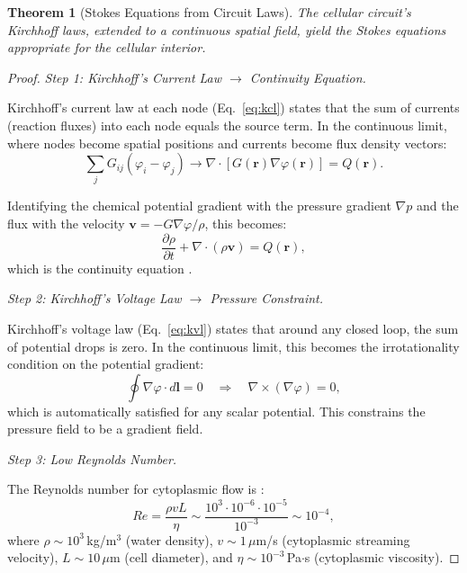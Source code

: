 \documentclass[11pt,twocolumn,a4paper]{article}
\newtheorem{theorem}{Theorem}[section]
\begin{document}
\begin{theorem}[Stokes Equations from Circuit Laws]
\label{thm:stokes-from-kirchhoff}
The cellular circuit's Kirchhoff laws, extended to a continuous spatial
field, yield the Stokes equations appropriate for the cellular interior.
\end{theorem}

\begin{proof}
\textit{Step 1: Kirchhoff's Current Law $\to$ Continuity Equation.}

Kirchhoff's current law at each node (Eq.~\eqref{eq:kcl}) states that
the sum of currents (reaction fluxes) into each node equals the source
term. In the continuous limit, where nodes become spatial positions and
currents become flux density vectors:
\begin{equation}
\sum_j G_{ij}(\varphi_i - \varphi_j) \to
  \nabla \cdot [G(\mathbf{r}) \nabla\varphi(\mathbf{r})]
  = Q(\mathbf{r}).
\label{eq:continuous-kcl}
\end{equation}

Identifying the chemical potential gradient with the pressure gradient
$\nabla p$ and the flux with the velocity $\mathbf{v} = -G \nabla
\varphi / \rho$, this becomes:
\begin{equation}
\frac{\partial \rho}{\partial t} +
  \nabla \cdot (\rho \mathbf{v}) = Q(\mathbf{r}),
\label{eq:continuity}
\end{equation}
which is the continuity equation \citep{navierstokes}.

\textit{Step 2: Kirchhoff's Voltage Law $\to$ Pressure Constraint.}

Kirchhoff's voltage law (Eq.~\eqref{eq:kvl}) states that around any
closed loop, the sum of potential drops is zero. In the continuous
limit, this becomes the irrotationality condition on the potential
gradient:
\begin{equation}
\oint \nabla\varphi \cdot d\mathbf{l} = 0
  \quad \Longrightarrow \quad
  \nabla \times (\nabla\varphi) = 0,
\label{eq:continuous-kvl}
\end{equation}
which is automatically satisfied for any scalar potential. This
constrains the pressure field to be a gradient field.

\textit{Step 3: Low Reynolds Number.}

The Reynolds number for cytoplasmic flow is
\citep{purcell1977,bergetal2002}:
\begin{equation}
Re = \frac{\rho v L}{\eta} \sim
  \frac{10^3 \cdot 10^{-6} \cdot 10^{-5}}{10^{-3}}
  \sim 10^{-4},
\label{eq:reynolds}
\end{equation}
where $\rho \sim 10^3$\,kg/m$^3$ (water density),
$v \sim 1$\,$\mu$m/s (cytoplasmic streaming velocity),
$L \sim 10$\,$\mu$m (cell diameter), and
$\eta \sim 10^{-3}$\,Pa$\cdot$s (cytoplasmic viscosity).


\end{proof}
\end{document}

